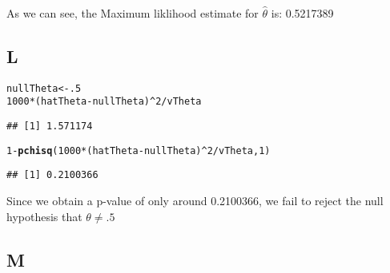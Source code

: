 \documentclass[10pt]{paper}\usepackage[]{graphicx}\usepackage[]{color}
\makeatletter
\newcommand{\hlnum}[1]{\textcolor[rgb]{0.686,0.059,0.569}{#1}}%
\newcommand{\hlopt}[1]{\textcolor[rgb]{0,0,0}{#1}}%
\newcommand{\hlstd}[1]{\textcolor[rgb]{0.345,0.345,0.345}{#1}}%
\newcommand{\hlkwb}[1]{\textcolor[rgb]{0.69,0.353,0.396}{#1}}%
\newcommand{\hlkwd}[1]{\textcolor[rgb]{0.737,0.353,0.396}{\textbf{#1}}}%
\newenvironment{kframe}{%
 \def\at@end@of@kframe{}%
 \ifinner\ifhmode%
  \def\at@end@of@kframe{\end{minipage}}%
  \begin{minipage}{\columnwidth}%
 \fi\fi%
 \def\FrameCommand##1{\hskip\@totalleftmargin \hskip-\fboxsep
 \colorbox{shadecolor}{##1}\hskip-\fboxsep
     \hskip-\linewidth \hskip-\@totalleftmargin \hskip\columnwidth}%
 \MakeFramed {\advance\hsize-\width
   \@totalleftmargin\z@ \linewidth\hsize
   \@setminipage}}%
 {\par\unskip\endMakeFramed%
 \at@end@of@kframe}
\newenvironment{knitrout}{}{} %
\makeatother
\begin{document}
As we can see, the Maximum liklihood estimate for $\hat{\theta}$ is: 0.5217389

\subsection*{L}


\begin{knitrout}
\color{fgcolor}\begin{kframe}
\begin{alltt}
\hlstd{nullTheta} \hlkwb{<-} \hlnum{.5}
\hlnum{1000}\hlopt{*}\hlstd{(hatTheta} \hlopt{-} \hlstd{nullTheta)}\hlopt{^}\hlnum{2} \hlopt{/} \hlstd{vTheta}
\end{alltt}
\begin{verbatim}
## [1] 1.571174
\end{verbatim}
\begin{alltt}
\hlnum{1}\hlopt{-} \hlkwd{pchisq}\hlstd{(} \hlnum{1000}\hlopt{*}\hlstd{(hatTheta} \hlopt{-} \hlstd{nullTheta)}\hlopt{^}\hlnum{2} \hlopt{/} \hlstd{vTheta,} \hlnum{1} \hlstd{)}
\end{alltt}
\begin{verbatim}
## [1] 0.2100366
\end{verbatim}
\end{kframe}
\end{knitrout}

Since we obtain a p-value of only around 0.2100366, we fail to reject
the null hypothesis that $\theta \neq .5$

\subsection*{M}
\end{document}
